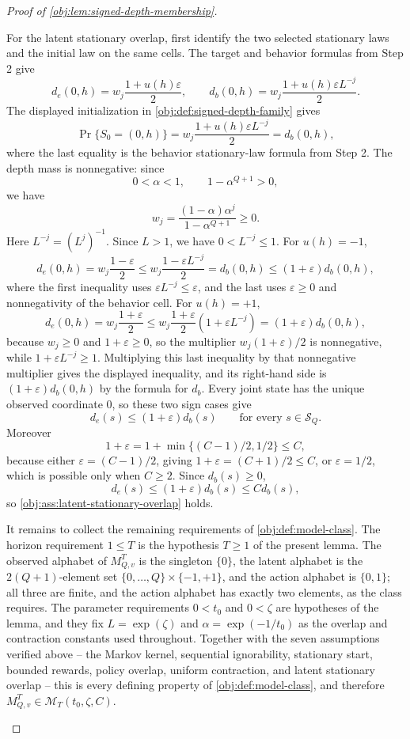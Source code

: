\documentclass[11pt]{article}
\begin{document}
\begin{proof}[Proof of \cref{obj:lem:signed-depth-membership}]
\begin{enumerate}
For the latent stationary overlap, first identify the two selected stationary
laws and the initial law on the same cells.  The target and behavior formulas
from Step 2 give
\[
d_e(0,h)
=
w_j\frac{1+u(h)\varepsilon}{2},
\qquad
d_b(0,h)
=
w_j\frac{1+u(h)\varepsilon L^{-j}}{2}.
\]
The displayed initialization in \cref{obj:def:signed-depth-family} gives
\[
\Pr\{S_0=(0,h)\}
=
w_j\frac{1+u(h)\varepsilon L^{-j}}{2}
=
d_b(0,h),
\]
where the last equality is the behavior stationary-law formula from Step 2.
The depth mass is nonnegative: since
\[
0<\alpha<1,
\qquad
1-\alpha^{Q+1}>0,
\]
we have
\[
w_j
=
\frac{(1-\alpha)\alpha^j}{1-\alpha^{Q+1}}
\ge0 .
\]
Here \(L^{-j}=(L^j)^{-1}\).  Since \(L>1\), we have \(0<L^{-j}\le1\).
For \(u(h)=-1\),
\[
d_e(0,h)
=
w_j\frac{1-\varepsilon}{2}
\le
w_j\frac{1-\varepsilon L^{-j}}2
=
d_b(0,h)
\le
(1+\varepsilon)d_b(0,h),
\]
where the first inequality uses \(\varepsilon L^{-j}\le\varepsilon\), and the
last uses \(\varepsilon\ge0\) and nonnegativity of the behavior cell.  For
\(u(h)=+1\),
\[
d_e(0,h)
=
w_j\frac{1+\varepsilon}{2}
\le
w_j\frac{1+\varepsilon}{2}(1+\varepsilon L^{-j})
=
(1+\varepsilon)d_b(0,h),
\]
because \(w_j\ge0\) and \(1+\varepsilon\ge0\), so the multiplier
\(w_j(1+\varepsilon)/2\) is nonnegative, while
\(1+\varepsilon L^{-j}\ge1\).  Multiplying this last inequality by that
nonnegative multiplier gives the displayed inequality, and its right-hand
side is \((1+\varepsilon)d_b(0,h)\) by the formula for \(d_b\).  Every joint state has the unique
observed coordinate \(0\), so these two sign cases give
\[
d_e(s)\le (1+\varepsilon)d_b(s)
\qquad\text{for every }s\in\mathcal S_Q.
\]
Moreover
\[
1+\varepsilon
=
1+\min\{(C-1)/2,1/2\}
\le C,
\]
because either \(\varepsilon=(C-1)/2\), giving
\(1+\varepsilon=(C+1)/2\le C\), or \(\varepsilon=1/2\), which is possible only
when \(C\ge2\).  Since \(d_b(s)\ge0\),
\[
d_e(s)\le (1+\varepsilon)d_b(s)\le C d_b(s),
\]
so \cref{obj:ass:latent-stationary-overlap} holds.

It remains to collect the remaining requirements of \cref{obj:def:model-class}.
The horizon requirement \(1\le T\) is the hypothesis \(T\ge1\) of the present
lemma.  The observed alphabet of \(M_{Q,v}^T\) is the singleton \(\{0\}\), the
latent alphabet is the \(2(Q+1)\)-element set
\(\{0,\ldots,Q\}\times\{-1,+1\}\), and the action alphabet is \(\{0,1\}\); all
three are finite, and the action alphabet has exactly two elements, as the
class requires.  The parameter requirements \(0<t_0\) and \(0<\zeta\) are
hypotheses of the lemma, and they fix \(L=\exp(\zeta)\) and
\(\alpha=\exp(-1/t_0)\) as the overlap and contraction constants used
throughout.  Together with the seven assumptions verified above -- the Markov
kernel, sequential ignorability, stationary start, bounded rewards, policy
overlap, uniform contraction, and latent stationary overlap -- this is every
defining property of \cref{obj:def:model-class}, and therefore
\(M_{Q,v}^T\in\mathcal M_T(t_0,\zeta,C)\).


\end{enumerate}
\end{proof}
\end{document}
